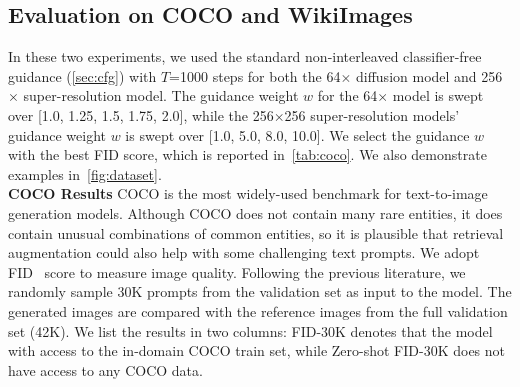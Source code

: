 \documentclass{article} \usepackage{iclr2023_conference,times}
\begin{document}
\subsection{Evaluation on COCO and WikiImages}
In these two experiments, we used the standard non-interleaved classifier-free guidance (\autoref{sec:cfg}) with $T$=1000 steps for both the 64$\times$ diffusion model and 256$\times$ super-resolution model. The guidance weight $w$ for the 64$\times$ model is swept over [1.0, 1.25, 1.5, 1.75, 2.0], while the 256$\times$256 super-resolution models' guidance weight $w$ is swept over [1.0, 5.0, 8.0, 10.0]. We select the guidance $w$ with the best FID score, which is reported in~\autoref{tab:coco}. We also demonstrate examples in~\autoref{fig:dataset}. \vspace{1ex} \\
\noindent \textbf{COCO Results}
COCO is the most widely-used benchmark for text-to-image generation models. Although COCO does not contain many rare entities, it does contain unusual combinations of common entities, so it is plausible that retrieval augmentation could also help with some challenging text prompts. We adopt FID~\citep{heusel2017gans} score to measure image quality. Following the previous literature, we randomly sample 30K prompts from the validation set as input to the model. The generated images are compared with the reference images from the full validation set (42K). We list the results in two columns: FID-30K denotes that the model with access to the in-domain COCO train set, while Zero-shot FID-30K does not have access to any COCO data. 
\end{document}

